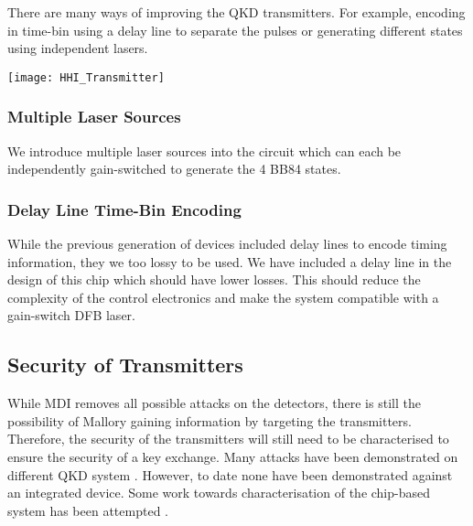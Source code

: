 There are many ways of improving the QKD transmitters. For example, encoding in time-bin using a delay line to separate the pulses or generating different states using independent lasers.

\begin{sidewaysfigure}
	\centering
	\texttt{[image: HHI\_Transmitter]}
	\caption[Latest generation InP QKD Transmitter]{Latest generation HHI indium phosphide transmitter. The \SI[product-units=power]{6x4}{mm} chip contains a few ways to create BB84 states for QKD. Firstly, we have designs to compare \ac{dfb} and \ac{DBR} lasers. Secondly, we can use a delay line to separate the time bins. Finally, we have multiplexed lasers to pulse independently lasers for each state.}
\end{sidewaysfigure}

\subsubsection*{Multiple Laser Sources}

We introduce multiple laser sources into the circuit which can each be independently gain-switched to generate the 4 BB84 states. 

\subsubsection*{Delay Line Time-Bin Encoding}

While the previous generation of devices included delay lines to encode timing information, they we too lossy to be used. We have included a delay line in the design of this chip which should have lower losses. This should reduce the complexity of the control electronics and make the system compatible with a gain-switch DFB laser.

\subsection{Security of Transmitters}

While \ac{MDI} removes all possible attacks on the detectors, there is still the possibility of Mallory gaining information by targeting the transmitters. Therefore, the security of the transmitters will still need to be characterised to ensure the security of a key exchange. Many attacks have been demonstrated on different \ac{QKD} system \cite{makarov2019}. However, to date none have been demonstrated against an integrated device. Some work towards characterisation of the chip-based system has been attempted \cite{vaquero2018}.

